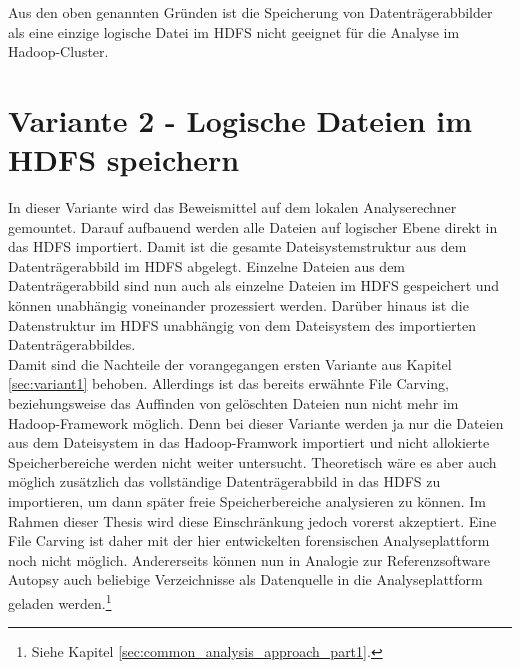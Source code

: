 \noindent
Aus den oben genannten Gründen ist die Speicherung von Datenträgerabbilder als eine einzige logische Datei im HDFS nicht geeignet für die Analyse im Hadoop-Cluster.

\section{Variante 2 - Logische Dateien im HDFS speichern}
In dieser Variante wird das Beweismittel auf dem lokalen Analyserechner gemountet. Darauf aufbauend werden alle Dateien auf logischer Ebene direkt in das HDFS importiert. Damit ist die gesamte Dateisystemstruktur aus dem Datenträgerabbild im HDFS abgelegt. Einzelne Dateien aus dem Datenträgerabbild sind nun auch als einzelne Dateien im HDFS gespeichert und können unabhängig voneinander prozessiert werden. Darüber hinaus ist die Datenstruktur im HDFS unabhängig von dem Dateisystem des importierten Datenträgerabbildes.\\
Damit sind die Nachteile der vorangegangen ersten Variante aus Kapitel \ref{sec:variant1} behoben. Allerdings ist das bereits erwähnte File Carving, beziehungsweise das Auffinden von gelöschten Dateien nun nicht mehr im Hadoop-Framework möglich. Denn bei dieser Variante werden ja nur die Dateien aus dem Dateisystem in das Hadoop-Framwork importiert und nicht allokierte Speicherbereiche werden nicht weiter untersucht. Theoretisch wäre es aber auch möglich zusätzlich das vollständige Datenträgerabbild in das HDFS zu importieren, um dann später freie Speicherbereiche analysieren zu können. Im Rahmen dieser Thesis wird diese Einschränkung jedoch vorerst akzeptiert. Eine File Carving ist daher mit der hier entwickelten forensischen Analyseplattform noch nicht möglich. Andererseits können nun in Analogie zur Referenzsoftware Autopsy auch beliebige Verzeichnisse als Datenquelle in die Analyseplattform geladen werden.\footnote{Siehe Kapitel \ref{sec:common_analysis_approach_part1}.}\\ 

